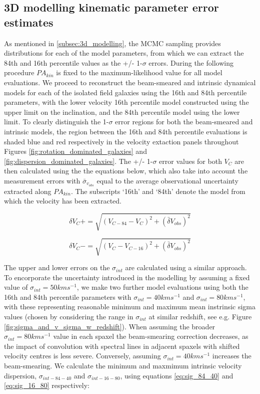 \documentclass[fleqn,usenatbib]{mnras}
\begin{document}
\subsection{3D modelling kinematic parameter error estimates}\label{appsubsec:model_errors}
As mentioned in \cref{subsec:3d_modelling}, the MCMC sampling provides distributions for each of the model parameters, from which we can extract the 84th and 16th percentile values as the +/- 1-$\sigma$ errors.
During the following procedure $PA_{kin}$ is fixed to the maximum-likelihood value for all model evaluations.
We proceed to reconstruct the beam-smeared and intrinsic dynamical models for each of the isolated field galaxies using the 16th and 84th percentile parameters, with the lower velocity 16th percentile model constructed using the upper limit on the inclination, and the 84th percentile model using the lower limit.
To clearly distinguish the 1-$\sigma$ error regions for both the beam-smeared and intrinsic models, the region between the 16th and 84th percentile evaluations is shaded blue and red respectively in the velocity extaction panels throughout Figures \ref{fig:rotation_dominated_galaxies} and \ref{fig:dispersion_dominated_galaxies}.
The +/- 1-$\sigma$ error values for both $V_{C}$ are then calculated using the the equations below, which also take into account the measurement errors with $\bar{\sigma}_{v_{obs}}$ equal to the average observational uncertainty extracted along $PA_{kin}$.
The subscripts `16th' and `84th' denote the model from which the velocity has been extracted.


\begin{equation}\label{eq:VC_plus}
   \delta V_{C}+ = \sqrt{\left(V_{C-84} - V_{C}\right)^{2} + \left(\bar{\delta}V_{obs}\right)^{2}}
\end{equation}

\begin{equation}\label{eq:VC_minus}
   \delta V_{C}- = \sqrt{\left(V_{C} - V_{C-16}\right)^{2}  + \left(\bar{\delta}V_{obs}\right)^{2}}
\end{equation}

The upper and lower errors on the $\sigma_{int}$ are calculated using a similar approach.
To encorporate the uncertainty introduced in the modelling by assuming a fixed value of $\sigma_{int}=50 kms^{-1}$, we make two further model evaluations using both the 16th and 84th percentile parameters with $\sigma_{int} = 40 kms^{-1}$ and $\sigma_{int} = 80 kms^{-1}$, with these representing reasonable minimum and maximum mean instrinsic sigma values (chosen by considering the range in $\sigma_{int}$ at similar redshift, see e.g. Figure \ref{fig:sigma_and_v_sigma_w_redshift}).
When assuming the broader $\sigma_{int} = 80 kms^{-1}$ value in each spaxel the beam-smearing correction decreases, as the impact of convolution with spectral lines in adjacent spaxels with shifted velocity centres is less severe.
Conversely, assuming $\sigma_{int} = 40 kms^{-1}$ increases the beam-smearing.
We calculate the minimum and maxmimum intrinsic velocity dispersion, $\sigma_{int-84-40}$ and $\sigma_{int-16-80}$, using equations \ref{eq:sig_84_40} and \ref{eq:sig_16_80} respectively:
\end{document}
